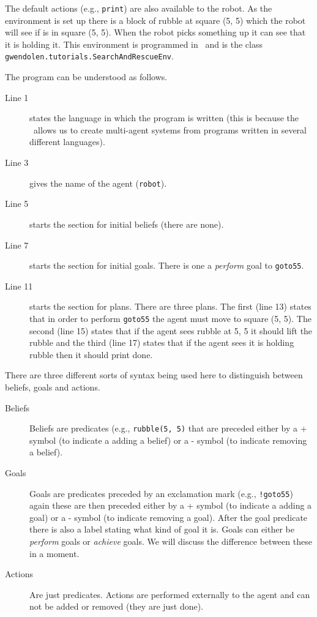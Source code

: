 The default actions (e.g., \lstinline{print}) are also available to the robot.  As the environment is set up there is a block of rubble at square (5, 5) which the robot will see if is in square (5, 5).  When the robot picks something  up it can see that it is holding it.  This environment is programmed in \java\ and is the class \lstinline{gwendolen.tutorials.SearchAndRescueEnv}.

The program can be understood as follows.  
\begin{description}
\item[Line 1] states the language in which the program is written (this is because the \ail\ allows us to create multi-agent systems from programs written in several different languages).  
\item[Line 3] gives the name of the agent (\lstinline{robot}).  
\item[Line 5] starts the section for initial beliefs (there are none).  
\item[Line 7] starts the section for initial goals.  There is one a \emph{perform} goal to \lstinline{goto55}.
\item[Line 11] starts the section for plans.  There are three plans.  The first (line 13) states that in order to perform \lstinline{goto55} the agent must move to square (5, 5).  The second (line 15) states that if the agent sees rubble at 5, 5 it should lift the rubble and the third  (line 17) states that if the agent sees it is holding rubble then it should print done.
\end{description}

There are three different sorts of syntax being used here to distinguish between beliefs, goals and actions.

\begin{description}
\item[Beliefs] Beliefs are predicates (e.g., \lstinline{rubble(5, 5)} that are preceded either by a + symbol (to indicate a adding a belief) or a - symbol (to indicate removing a belief).
\item[Goals] Goals are predicates preceded by an exclamation mark (e.g., \lstinline{!goto55}) again these are then preceded  either by a + symbol (to indicate a adding a goal) or a - symbol (to indicate removing a goal).  After the goal predicate there is also a label stating what kind of goal it is.  Goals can either be \emph{perform} goals or \emph{achieve} goals.  We will discuss the difference between these in a moment.
\item[Actions] Are just predicates.  Actions are performed externally to the agent and can not be added or removed (they are just done).
\end{description}

